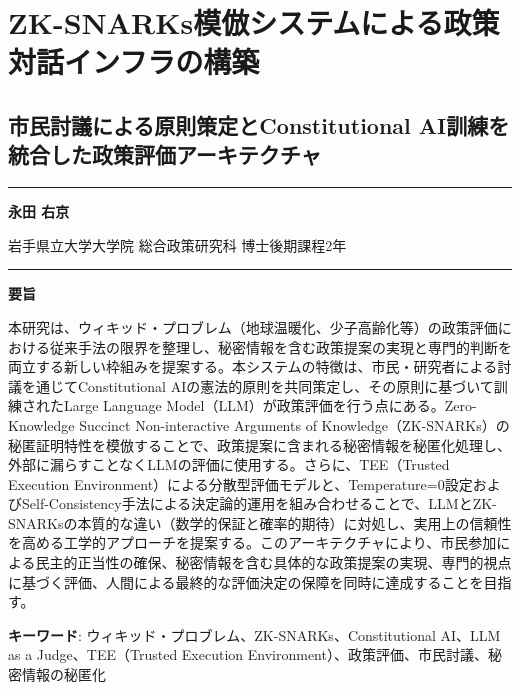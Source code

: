 \section{ZK-SNARKs模倣システムによる政策対話インフラの構築}\label{zk-snarksux6a21ux5023ux30b7ux30b9ux30c6ux30e0ux306bux3088ux308bux653fux7b56ux5bfeux8a71ux30a4ux30f3ux30d5ux30e9ux306eux69cbux7bc9}

\subsection{市民討議による原則策定とConstitutional AI訓練を統合した政策評価アーキテクチャ}\label{ux5e02ux6c11ux8a0eux8b70ux306bux3088ux308bux539fux5247ux7b56ux5b9aux3068constitutional-aiux8a13ux7df4ux3092ux7d71ux5408ux3057ux305fux653fux7b56ux8a55ux4fa1ux30a2ux30fcux30adux30c6ux30afux30c1ux30e3}

\begin{center}\rule{0.5\linewidth}{0.5pt}\end{center}

\textbf{永田 右京}

岩手県立大学大学院 総合政策研究科 博士後期課程2年

\begin{center}\rule{0.5\linewidth}{0.5pt}\end{center}

\textbf{要旨}

本研究は、ウィキッド・プロブレム（地球温暖化、少子高齢化等）の政策評価における従来手法の限界を整理し、秘密情報を含む政策提案の実現と専門的判断を両立する新しい枠組みを提案する。本システムの特徴は、市民・研究者による討議を通じてConstitutional AIの憲法的原則を共同策定し、その原則に基づいて訓練されたLarge Language Model（LLM）が政策評価を行う点にある。Zero-Knowledge Succinct Non-interactive Arguments of Knowledge（ZK-SNARKs）の秘匿証明特性を模倣することで、政策提案に含まれる秘密情報を秘匿化処理し、外部に漏らすことなくLLMの評価に使用する。さらに、TEE（Trusted Execution Environment）による分散型評価モデルと、Temperature=0設定およびSelf-Consistency手法による決定論的運用を組み合わせることで、LLMとZK-SNARKsの本質的な違い（数学的保証と確率的期待）に対処し、実用上の信頼性を高める工学的アプローチを提案する。このアーキテクチャにより、市民参加による民主的正当性の確保、秘密情報を含む具体的な政策提案の実現、専門的視点に基づく評価、人間による最終的な評価決定の保障を同時に達成することを目指す。

\textbf{キーワード}: ウィキッド・プロブレム、ZK-SNARKs、Constitutional AI、LLM as a Judge、TEE（Trusted Execution Environment）、政策評価、市民討議、秘密情報の秘匿化

